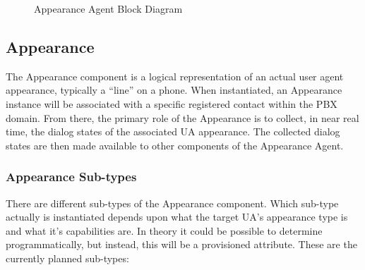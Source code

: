 \documentclass[twoside,11pt]{article}
\newcommand{\PAA}{Appearance Agent\space}
\begin{document}
\begin{figure}[ht] \centering
{}
\caption{Appearance Agent Block Diagram}
\label{AABlockDiagram}
\end{figure}

\subsection{Appearance}
The Appearance component is a logical representation of an actual user agent appearance, typically a
``line'' on a phone.  When instantiated, an Appearance instance will be associated with a specific
registered contact within the PBX domain.  From there, the primary role of the Appearance is to
collect, in near real time, the dialog states of the associated UA appearance. The collected dialog
states are then made available to other components of the \PAA.

\subsubsection{Appearance Sub-types}
There are different sub-types of the Appearance component.  Which sub-type actually is instantiated
depends upon what the target UA's appearance type is and what it's capabilities are.  In theory it
could be possible to determine programmatically, but instead, this will be a provisioned attribute. 
These are the currently planned sub-types:
\end{document}
